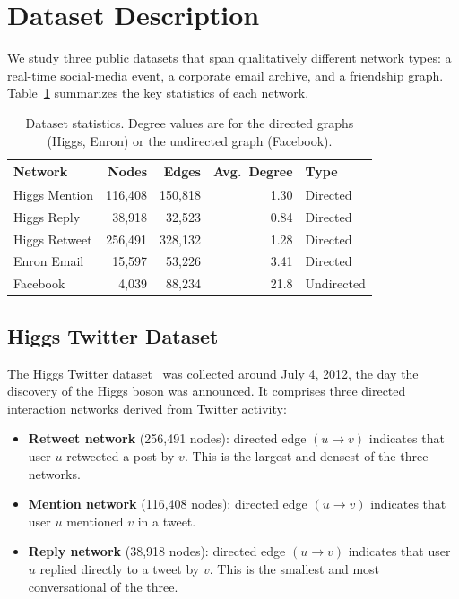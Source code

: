 \section{Dataset Description}
\label{sec:data}

We study three public datasets that span qualitatively different network
types: a real-time social-media event, a corporate email archive, and a
friendship graph.
Table~\ref{tab:datasets} summarizes the key statistics of each network.

\begin{table}[!ht]
\centering
\caption{Dataset statistics. Degree values are for the directed graphs
         (Higgs, Enron) or the undirected graph (Facebook).}
\label{tab:datasets}
\begin{tabular}{lrrrl}
\toprule
\textbf{Network} & \textbf{Nodes} & \textbf{Edges} & \textbf{Avg.\ Degree} & \textbf{Type} \\
\midrule
Higgs Mention  & 116{,}408 & 150{,}818 & 1.30 & Directed \\
Higgs Reply    &  38{,}918 &  32{,}523 & 0.84 & Directed \\
Higgs Retweet  & 256{,}491 & 328{,}132 & 1.28 & Directed \\
Enron Email    &  15{,}597 &  53{,}226 & 3.41 & Directed \\
Facebook       &   4{,}039 &  88{,}234 & 21.8 & Undirected \\
\bottomrule
\end{tabular}
\end{table}

\subsection{Higgs Twitter Dataset}

The Higgs Twitter dataset~\citep{higgs2013} was collected around July 4, 2012,
the day the discovery of the Higgs boson was announced.
It comprises three directed interaction networks derived from Twitter activity:

\begin{itemize}
    \item \textbf{Retweet network} (256{,}491 nodes): directed edge $(u \to v)$
          indicates that user $u$ retweeted a post by $v$.
          This is the largest and densest of the three networks.
    \item \textbf{Mention network} (116{,}408 nodes): directed edge $(u \to v)$
          indicates that user $u$ mentioned $v$ in a tweet.
    \item \textbf{Reply network} (38{,}918 nodes): directed edge $(u \to v)$
          indicates that user $u$ replied directly to a tweet by $v$.
          This is the smallest and most conversational of the three.
\end{itemize}


